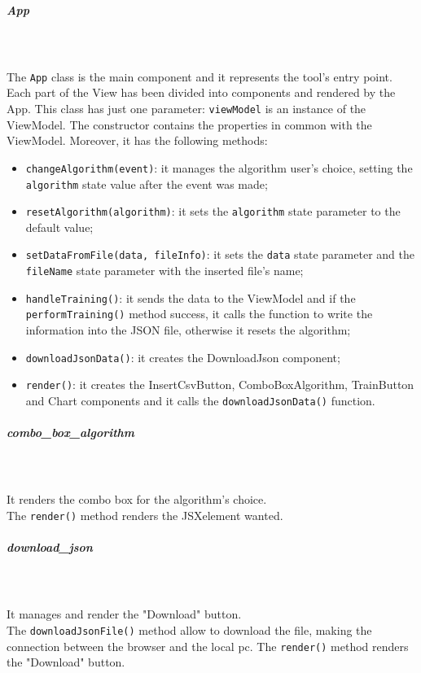 \subparagraph*{App}\mbox{} \\ \mbox{} \\
The \texttt{App} class is the main component and it represents the tool's entry point. Each part of the View has been divided into components and rendered by the App. This class has just one parameter: \texttt{viewModel} is an instance of the ViewModel. The constructor contains the properties in common with the ViewModel. Moreover, it has the following methods:
\begin{itemize}
\item \texttt{changeAlgorithm(event)}: it manages the algorithm user's choice, setting the \\ \texttt{algorithm} state value after the event was made;
\item \texttt{resetAlgorithm(algorithm)}: it sets the \texttt{algorithm} state parameter to the default value;
\item \texttt{setDataFromFile(data, fileInfo)}: it sets the \texttt{data} state parameter and the \\ \texttt{fileName} state parameter with the inserted file's name;
\item \texttt{handleTraining()}: it sends the data to the ViewModel and if the \texttt{performTraining()} method success, it calls the function to write the information into the JSON file, otherwise it resets the algorithm;
\item \texttt{downloadJsonData()}: it creates the DownloadJson component;
\item \texttt{render()}: it creates the InsertCsvButton, ComboBoxAlgorithm, TrainButton and Chart components and it calls the \texttt{downloadJsonData()} function.
\end{itemize}	

\subparagraph*{combo\_box\_algorithm}\mbox{} \\ \mbox{} \\
It renders the combo box for the algorithm's choice.\\
The \texttt{render()} method renders the JSX\glo element wanted.

\subparagraph*{download\_json}\mbox{} \\ \mbox{} \\
It manages and render the "Download" button.\\
The \texttt{downloadJsonFile()} method allow to download the file, making the connection between the browser and the local pc.
The \texttt{render()} method renders the "Download" button.

